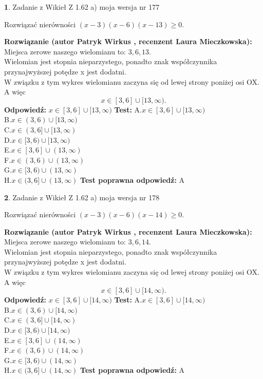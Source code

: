 \documentclass[12pt, a4paper]{article}
\theoremstyle{definition} %
\newtheorem{zad}{}
\newcommand{\zadStart}[1]{\begin{zad}#1\newline}
\newcommand{\zadStop}{\end{zad}}
\newcommand{\rozwStart}[2]{\noindent \textbf{Rozwiązanie (autor #1 , recenzent #2): }\newline}
\newcommand{\rozwStop}{\newline}
\newcommand{\odpStart}{\noindent \textbf{Odpowiedź:}\newline}
\newcommand{\odpStop}{\newline}
\newcommand{\testStart}{\noindent \textbf{Test:}\newline}
\newcommand{\testStop}{\newline}
\newcommand{\kluczStart}{\noindent \textbf{Test poprawna odpowiedź:}\newline}
\newcommand{\kluczStop}{\newline}
\begin{document}
\zadStart{Zadanie z Wikieł Z 1.62 a) moja wersja nr 177}

Rozwiązać nierówności $(x-3)(x-6)(x-13)\ge0$.
\zadStop
\rozwStart{Patryk Wirkus}{Laura Mieczkowska}
Miejsca zerowe naszego wielomianu to: $3, 6, 13$.\\
Wielomian jest stopnia nieparzystego, ponadto znak współczynnika przy\linebreak najwyższej potędze x jest dodatni.\\ W związku z tym wykres wielomianu zaczyna się od lewej strony poniżej osi OX. A więc $$x \in [3,6] \cup [13,\infty).$$
\rozwStop
\odpStart
$x \in [3,6] \cup [13,\infty)$
\odpStop
\testStart
A.$x \in [3,6] \cup [13,\infty)$\\
B.$x \in (3,6) \cup [13,\infty)$\\
C.$x \in (3,6] \cup [13,\infty)$\\
D.$x \in [3,6) \cup [13,\infty)$\\
E.$x \in [3,6] \cup (13,\infty)$\\
F.$x \in (3,6) \cup (13,\infty)$\\
G.$x \in [3,6) \cup (13,\infty)$\\
H.$x \in (3,6] \cup (13,\infty)$
\testStop
\kluczStart
A
\kluczStop



\zadStart{Zadanie z Wikieł Z 1.62 a) moja wersja nr 178}

Rozwiązać nierówności $(x-3)(x-6)(x-14)\ge0$.
\zadStop
\rozwStart{Patryk Wirkus}{Laura Mieczkowska}
Miejsca zerowe naszego wielomianu to: $3, 6, 14$.\\
Wielomian jest stopnia nieparzystego, ponadto znak współczynnika przy\linebreak najwyższej potędze x jest dodatni.\\ W związku z tym wykres wielomianu zaczyna się od lewej strony poniżej osi OX. A więc $$x \in [3,6] \cup [14,\infty).$$
\rozwStop
\odpStart
$x \in [3,6] \cup [14,\infty)$
\odpStop
\testStart
A.$x \in [3,6] \cup [14,\infty)$\\
B.$x \in (3,6) \cup [14,\infty)$\\
C.$x \in (3,6] \cup [14,\infty)$\\
D.$x \in [3,6) \cup [14,\infty)$\\
E.$x \in [3,6] \cup (14,\infty)$\\
F.$x \in (3,6) \cup (14,\infty)$\\
G.$x \in [3,6) \cup (14,\infty)$\\
H.$x \in (3,6] \cup (14,\infty)$
\testStop
\kluczStart
A
\kluczStop
\end{document}
